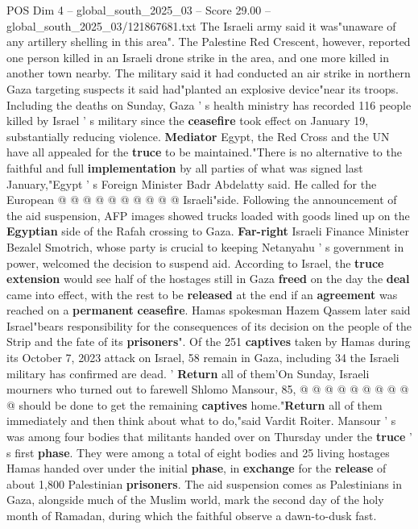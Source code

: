 \begin{textsample}{POS Dim 4 – global\_south\_2025\_03 – Score 29.00 – global\_south\_2025\_03/121867681.txt}
The Israeli army said it was"unaware of any artillery shelling in this area".
The Palestine Red Crescent, however, reported one person killed in an Israeli drone strike in the area, and one more killed in another town nearby.
The military said it had conducted an air strike in northern Gaza targeting suspects it said had"planted an explosive device"near its troops.
Including the deaths on Sunday, Gaza ' s health ministry has recorded 116 people killed by Israel ' s military since the \textbf{ceasefire} took effect on January 19, substantially reducing violence. \textbf{Mediator} Egypt, the Red Cross and the UN have all appealed for the \textbf{truce} to be maintained."There is no alternative to the faithful and full \textbf{implementation} by all parties of what was signed last January,"Egypt ' s Foreign Minister Badr Abdelatty said.
He called for the European @ @ @ @ @ @ @ @ @ @ Israeli"side.
Following the announcement of the aid suspension, AFP images showed trucks loaded with goods lined up on the \textbf{Egyptian} side of the Rafah crossing to Gaza. \textbf{Far-right} Israeli Finance Minister Bezalel Smotrich, whose party is crucial to keeping Netanyahu ' s government in power, welcomed the decision to suspend aid.
According to Israel, the \textbf{truce} \textbf{extension} would see half of the hostages still in Gaza \textbf{freed} on the day the \textbf{deal} came into effect, with the rest to be \textbf{released} at the end if an \textbf{agreement} was reached on a \textbf{permanent} \textbf{ceasefire}.
Hamas spokesman Hazem Qassem later said Israel"bears responsibility for the consequences of its decision on the people of the Strip and the fate of its \textbf{prisoners}".
Of the 251 \textbf{captives} taken by Hamas during its October 7, 2023 attack on Israel, 58 remain in Gaza, including 34 the Israeli military has confirmed are dead. ' \textbf{Return} all of them'On Sunday, Israeli mourners who turned out to farewell Shlomo Mansour, 85, @ @ @ @ @ @ @ @ @ @ should be done to get the remaining \textbf{captives} home."\textbf{Return} all of them immediately and then think about what to do,"said Vardit Roiter.
Mansour ' s was among four bodies that militants handed over on Thursday under the \textbf{truce} ' s first \textbf{phase}.
They were among a total of eight bodies and 25 living hostages Hamas handed over under the initial \textbf{phase}, in \textbf{exchange} for the \textbf{release} of about 1,800 Palestinian \textbf{prisoners}.
The aid suspension comes as Palestinians in Gaza, alongside much of the Muslim world, mark the second day of the holy month of Ramadan, during which the faithful observe a dawn-to-dusk fast.

\end{textsample}
